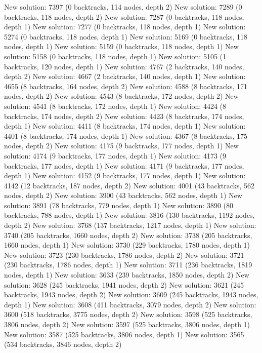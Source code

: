 \begin{enumerate}
{\begin{DoxyCode}
New solution: 7397 (0 backtracks, 114 nodes, depth 2)
New solution: 7289 (0 backtracks, 118 nodes, depth 2)
New solution: 7287 (0 backtracks, 118 nodes, depth 1)
New solution: 7277 (0 backtracks, 118 nodes, depth 1)
New solution: 5274 (0 backtracks, 118 nodes, depth 1)
New solution: 5169 (0 backtracks, 118 nodes, depth 1)
New solution: 5159 (0 backtracks, 118 nodes, depth 1)
New solution: 5158 (0 backtracks, 118 nodes, depth 1)
New solution: 5105 (1 backtracks, 120 nodes, depth 1)
New solution: 4767 (2 backtracks, 140 nodes, depth 2)
New solution: 4667 (2 backtracks, 140 nodes, depth 1)
New solution: 4655 (8 backtracks, 164 nodes, depth 2)
New solution: 4588 (8 backtracks, 171 nodes, depth 2)
New solution: 4543 (8 backtracks, 172 nodes, depth 2)
New solution: 4541 (8 backtracks, 172 nodes, depth 1)
New solution: 4424 (8 backtracks, 174 nodes, depth 2)
New solution: 4423 (8 backtracks, 174 nodes, depth 1)
New solution: 4411 (8 backtracks, 174 nodes, depth 1)
New solution: 4401 (8 backtracks, 174 nodes, depth 1)
New solution: 4367 (8 backtracks, 175 nodes, depth 2)
New solution: 4175 (9 backtracks, 177 nodes, depth 1)
New solution: 4174 (9 backtracks, 177 nodes, depth 1)
New solution: 4173 (9 backtracks, 177 nodes, depth 1)
New solution: 4171 (9 backtracks, 177 nodes, depth 1)
New solution: 4152 (9 backtracks, 177 nodes, depth 1)
New solution: 4142 (12 backtracks, 187 nodes, depth 2)
New solution: 4001 (43 backtracks, 562 nodes, depth 2)
New solution: 3900 (43 backtracks, 562 nodes, depth 1)
New solution: 3891 (78 backtracks, 779 nodes, depth 1)
New solution: 3890 (80 backtracks, 788 nodes, depth 1)
New solution: 3816 (130 backtracks, 1192 nodes, depth 2)
New solution: 3768 (137 backtracks, 1217 nodes, depth 1)
New solution: 3740 (205 backtracks, 1660 nodes, depth 2)
New solution: 3738 (205 backtracks, 1660 nodes, depth 1)
New solution: 3730 (229 backtracks, 1780 nodes, depth 1)
New solution: 3723 (230 backtracks, 1786 nodes, depth 2)
New solution: 3721 (230 backtracks, 1786 nodes, depth 1)
New solution: 3711 (236 backtracks, 1819 nodes, depth 1)
New solution: 3633 (239 backtracks, 1850 nodes, depth 2)
New solution: 3628 (245 backtracks, 1941 nodes, depth 2)
New solution: 3621 (245 backtracks, 1943 nodes, depth 2)
New solution: 3609 (245 backtracks, 1943 nodes, depth 1)
New solution: 3608 (411 backtracks, 3079 nodes, depth 2)
New solution: 3600 (518 backtracks, 3775 nodes, depth 2)
New solution: 3598 (525 backtracks, 3806 nodes, depth 2)
New solution: 3597 (525 backtracks, 3806 nodes, depth 1)
New solution: 3587 (525 backtracks, 3806 nodes, depth 1)
New solution: 3565 (534 backtracks, 3846 nodes, depth 2)

\end{DoxyCode}}
\end{enumerate}
